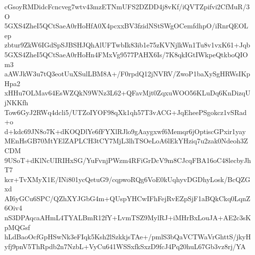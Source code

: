 cGsoyRMDidcFcncveg7wtv43mzETNmUFS2DZDD4j8vKf/iQVTZpifvi2CfMuR/3O
5GXS4ZheI5QCtSaeA0rHoHfA0X4pcxxBV3fzidNStSWgOCemfdhpO/iRnrQEOLep
zbtur9ZkW6IGdSpSJBSHJQhAlUFTwbIk83ib1e75zKVNjlkWn1Tu8v1vxK61+Jqb
5GXS4ZheI5QCtSaeA0rHoHn4FMxVg9577PAHX6Is/7K8qkIGtIWkpeQtkboQIOm3
aAWJkW3u7tQ3eotUuXSulLBM8A+/F0rpdQ12jNVRV/ZwoP1baXySgHRWsIKpHpa2
xHHu7OLMav64EsWZQkN9WNz3L62+QFavMjt0ZqxuWOO56KLuDq6KnDizqUjNKKfh
Tow6GyJ2RWq4dcli5/UTZoIYOF98qXk1qh57T3vACG+JqEheePSgokcz1vSRad+o
d+kdc69JN8o7K+dKOQDlYe6fFYXlRJlo9gAaygxwf6Memqr6jOptiscGPxir1yay
MEnHsGB70MtYElZAPLCH3tCY7MjL3lhTSOeLoA6lEkYHziq7u2zak0Ndeoh3ZCDM
9USoT+dKlNcUIRIHxSG/YuFvnjPWzm4RFiGrDcV9m8CJcqFBA16oC48lecbyJhT7
kcr+TvXMyX1E/INi801ycQetuG9/cqpwoRQg6VoE0kUqhyvDGDhyLosk/BcQZGxd
AI6yGCu6SPC/QZhXYJGbG4m+QUspYHCwIFhFejRvEZpSjF1aBQkCkq0LqnZ6Oiv4
nS3DPAqcaAHmL4TYALBmR12fY+LvmTSZ9MylRJ+iMHrBxLouJA+AE2c3sKpMQGsf
hLdBaoOcfGpHSwNk3eFIqk5Ksh2lSzkkjsTAe+/pmlS3bQaVCTWaVrGhttS/jkyH
yfj9pnV5ThRpdb2n7NzbL+VyCu641WSSxfkSxzD9fcJ4Pq20huL67Gb3vz8rj/YA
